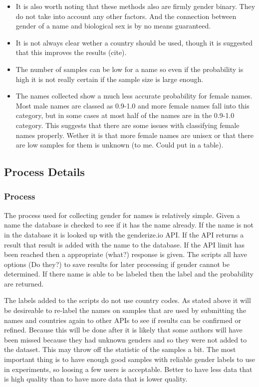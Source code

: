 \documentclass{article}
\begin{document}
\begin{itemize}
    \item It is also worth noting that these methods also are firmly gender binary. They do not take into account any other factors. And the connection between gender of a name and biological sex is by no means guaranteed.

    \item It is not always clear wether a country should be used, though it is suggested that this improves the results (cite).

    \item The number of samples can be low for a name so even if the probability is high it is not really certain if the sample size is large enough.

    \item The names collected show a much less accurate probability for female names. Most male names are classed as 0.9-1.0 and more female names fall into this category, but in some cases at most half of the names are in the 0.9-1.0 category. This suggests that there are some issues with classifying female names properly. Wether it is that more female names are unisex or that there are low samples for them is unknown (to me. Could put in a table).
\end{itemize}


\subsection{Process Details}
\subsubsection{Process}
The process used for collecting gender for names is relatively simple. Given a name the database is checked to see if it has the name already. If the name is not in the database it is looked up with the genderize.io API. If the API returns a result that result is added with the name to the database. If the API limit has been reached then a appropriate (what?) response is given. The scripts all have options (Do they?) to save results for later processing if gender cannot be determined. If there name is able to be labeled then the label and the probability are returned.

The labels added to the scripts do not use country codes. As stated above it will be desireable to re-label the names on samples that are used by submitting the names and countries again to other APIs to see if results can be confirmed or refined. Because this will be done after it is likely that some authors will have been missed because they had unknown genders and so they were not added to the dataset. This may throw off the statistic of the samples a bit. The most important thing is to have enough good samples with reliable gender labels to use in experiments, so loosing a few users is acceptable. Better to have less data that is high quality than to have more data that is lower quality.
\end{document}
